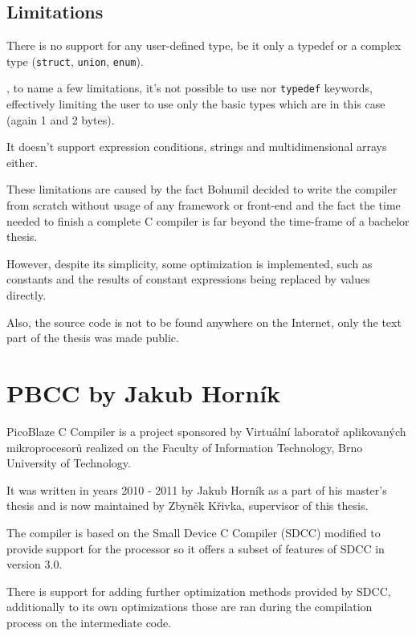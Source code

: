         \subsection{Limitations}

        There is no support for any user-defined type, be it only a typedef or a complex type (\texttt{struct}, \texttt{union}, \texttt{enum}).

    ,
    to name a few limitations, it's not possible to use
    nor \texttt{typedef} keywords,
    effectively limiting the user to use only the basic types which are in this case  (again 1 and 2 bytes).

    It doesn't support expression conditions, strings and multidimensional arrays either.

    These limitations are caused by the fact Bohumil decided to write the compiler
    from scratch without usage of any framework or front-end and the fact the time needed to finish a complete C compiler is far beyond the time-frame of a bachelor thesis.

    However, despite its simplicity, some optimization is implemented, 
    such as constants and the results of constant expressions being replaced by values directly.

    Also, the source code is not to be found anywhere on the Internet, only the text part of the thesis was made public.


    \section{PBCC by Jakub Horník}\label{prev_pbcc}


    PicoBlaze C Compiler is a project sponsored by Virtuální laboratoř aplikovaných mikroprocesorů %
    realized on the Faculty of Information Technology, Brno University of Technology.

    It was written in years 2010 - 2011 by Jakub Horník as a part of his master's thesis and is now maintained by Zbyněk Křivka, supervisor of this thesis.

    The compiler is based on the Small Device C Compiler (SDCC) modified to provide support for the processor so it offers a subset of features of SDCC in version 3.0.

    There is support for adding further optimization methods provided by SDCC, additionally to its own optimizations those are ran during the compilation process on the intermediate code.

